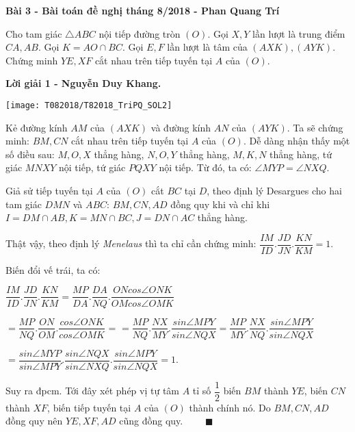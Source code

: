 \begin{framed}\noindent
	
	\textbf{Bài 3 - Bài toán đề nghị tháng 8/2018 - Phan Quang Trí}
	
	Cho tam giác $\triangle ABC$ nội tiếp đường tròn $(O)$. Gọi $X, Y$ lần lượt là trung điểm $CA, AB$. Gọi $K = AO \cap BC$. Gọi $E, F$ lần lượt là tâm của $(AXK), (AYK)$. Chứng minh $YE, XF$ cắt nhau trên tiếp tuyến tại $A$ của $(O)$.
	
\end{framed}

\textbf{Lời giải 1 - Nguyễn Duy Khang.}

\begin{center}
	\texttt{[image: T082018/T82018\_TriPQ\_SOL2]}
	
\end{center}

Kẻ đường kính $AM$ của $(AXK)$ và đường kính $AN$ của $(AYK)$. Ta sẽ chứng minh: $BM, CN$ cắt nhau trên tiếp tuyến tại $A$ của $(O)$. Dễ dàng nhận thấy một số điều sau: $M, O, X$ thẳng hàng, $N, O, Y$ thẳng hàng, $M, K, N$ thẳng hàng, tứ giác $MNXY$ nội tiếp, tứ giác $PQXY$ nội tiếp. Từ đó, ta có: $\angle MYP = \angle NXQ$.

Giả sử tiếp tuyến tại $A$ của $(O)$ cắt $BC$ tại $D$, theo định lý Desargues cho hai tam giác $DMN$ và $ABC$: $BM, CN, AD$ đồng quy khi và chỉ khi $I = DM \cap AB, K = MN \cap BC, J = DN \cap AC$ thẳng hàng.

Thật vậy, theo định lý \textit{Menelaus} thì ta chỉ cần chứng minh: $ \dfrac{IM}{ID}.\dfrac{JD}{JN}.\dfrac{KN}{KM} = 1$.

Biến đổi vế trái, ta có: 

$ \dfrac{IM}{ID}.\dfrac{JD}{JN}.\dfrac{KN}{KM} = \dfrac{MP}{DA}.\dfrac{DA}{NQ}.\dfrac{ON cos{\angle ONK}}{OM cos {\angle OMK}}$

$= \dfrac{MP}{NQ}.\dfrac{ON}{OM}.\dfrac{cos{\angle ONK}}{cos {\angle OMK}}$ = $= \dfrac{MP}{NQ}.\dfrac{NX}{MY}.\dfrac{sin{\angle MPY}}{sin{\angle NQX}} = \dfrac{MP}{MY}.\dfrac{NX}{NQ}.\dfrac{sin{\angle MPY}}{sin{\angle NQX}}$

$= \dfrac{sin{\angle MYP}}{sin{\angle MPY}}.\dfrac{sin{\angle NQX}}{sin{\angle NXQ}}.\dfrac{sin{\angle MPY}}{sin{\angle NQX}} = 1$.

Suy ra đpcm. Tới đây xét phép vị tự tâm $A$ tỉ số $\dfrac{1}{2}$ biến $BM$ thành $YE$, biến $CN$ thành $XF$, biến tiếp tuyến tại $A$ của $(O)$ thành chính nó. Do $BM, CN, AD$ đồng quy nên $YE, XF, AD$ cũng đồng quy. $\qquad \blacksquare$

